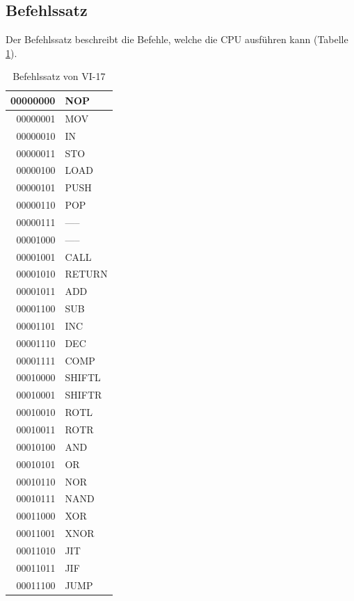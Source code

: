 \documentclass[12pt]{article}
\begin{document}
\subsection{Befehlssatz}

Der Befehlssatz beschreibt die Befehle, welche die CPU ausführen kann (Tabelle \ref{tab:befehlssatz}).
\newpage
\begin{table}[!htb]
\centering
\begin{tabular}{|r|l|}
  \hline
  00000000 & NOP \\
  \hline
  00000001 & MOV\\ 
  \hline
  00000010 & IN\\
  \hline
  00000011 & STO\\
  \hline
  00000100 & LOAD\\
  \hline
  00000101 & PUSH \\ 
  \hline
  00000110 & POP\\
  \hline
  00000111 & -----\\
 \hline
  00001000 & ----- \\
  \hline
  00001001 & CALL\\ 
  \hline
  00001010 & RETURN\\
  \hline
  00001011 & ADD\\
  \hline 
 00001100 & SUB \\
  \hline
  00001101 & INC\\ 
  \hline
  00001110 & DEC\\
  \hline
  00001111 & COMP\\
  \hline
  00010000 & SHIFTL\\
  \hline
  00010001 & SHIFTR\\ 
  \hline
  00010010 & ROTL\\
  \hline
  00010011 & ROTR\\
  \hline
  00010100 & AND\\
  \hline
  00010101 & OR \\ 
  \hline
  00010110 & NOR\\
  \hline
  00010111 & NAND\\
  \hline
  00011000 & XOR\\
  \hline
  00011001 & XNOR \\
  \hline
  00011010 & JIT\\
  \hline
  00011011 & JIF\\
  \hline
  00011100 & JUMP\\
  \hline
\end{tabular}
\caption{Befehlssatz von VI-17}
\label{tab:befehlssatz}
\end{table}
\end{document}
